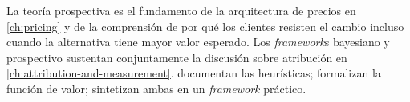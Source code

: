 La teoría prospectiva es el fundamento de la arquitectura de precios en \cref{ch:pricing} y de la
comprensión de por qué los clientes resisten el cambio incluso cuando la alternativa tiene mayor
valor esperado. Los \emph{framework}s bayesiano y prospectivo sustentan conjuntamente la discusión
sobre atribución en \cref{ch:attribution-and-measurement}. \textcite{tversky1974judgment} documentan
las heurísticas; \textcite{kahneman1979prospect} formalizan la función de valor;
\textcite{kahneman2011} sintetizan ambas en un \emph{framework} práctico.
